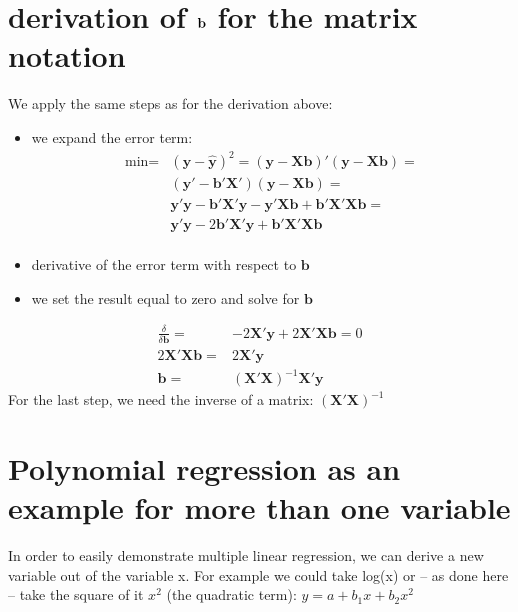 \documentclass[letterpaper,10pt,english]{jupyterBook}
\begin{document}
\chapter{derivation of \protect\(\mathbf{b}\protect\) for the matrix notation}
\label{\detokenize{Regression_Techniques:derivation-of-mathbf-b-for-the-matrix-notation}}
\sphinxAtStartPar
We apply the same steps as for the derivation above:
\begin{itemize}
\item {} 
\sphinxAtStartPar
we expand the error term:
\begin{align*}
    \text{min}=&(\mathbf{y}-\hat{\mathbf{y}})^2=(\mathbf{y}-\mathbf{X}\mathbf{b})'(\mathbf{y}-\mathbf{X}\mathbf{b})=\\
    &(\mathbf{y}'-\mathbf{b}'\mathbf{X}')(\mathbf{y}-\mathbf{X}\mathbf{b})=\\
    &\mathbf{y}'\mathbf{y}-\mathbf{b}'\mathbf{X}'\mathbf{y}-\mathbf{y}'
    \mathbf{X}\mathbf{b}+\mathbf{b}'\mathbf{X}'\mathbf{X}\mathbf{b}=\\
    &\mathbf{y}'\mathbf{y}-2\mathbf{b}'\mathbf{X}'\mathbf{y}+\mathbf{b}'\mathbf{X}'
    \mathbf{X}\mathbf{b}\\
  \end{align*}
\item {} 
\sphinxAtStartPar
derivative of the error term with respect to \(\mathbf{b}\)

\item {} 
\sphinxAtStartPar
we set the result equal to zero and solve for \(\mathbf{b}\)

\end{itemize}
\begin{align*}
    \frac{\delta}{\delta
      \mathbf{b}}=&-2\mathbf{X}'\mathbf{y}+2\mathbf{X}'\mathbf{X}\mathbf{b}=0\\
    2\mathbf{X}'\mathbf{X}\mathbf{b}=&2\mathbf{X}'\mathbf{y}\\
    \mathbf{b}=&(\mathbf{X}'\mathbf{X})^{-1}\mathbf{X}'\mathbf{y}\quad
  \end{align*}
\sphinxAtStartPar
For the last step, we need the inverse of a matrix: \((\mathbf{X}'\mathbf{X})^{-1}\)


\chapter{Polynomial regression as an example for more than one variable}
\label{\detokenize{Regression_Techniques:polynomial-regression-as-an-example-for-more-than-one-variable}}
\sphinxAtStartPar
In order to easily demonstrate multiple linear regression, we can derive a new variable out of the variable x. For example we could take log(x) or – as done here – take the square of it \(x^2\) (the quadratic term): \(y = a + b_1 x + b_2 x^2\)
\end{document}
